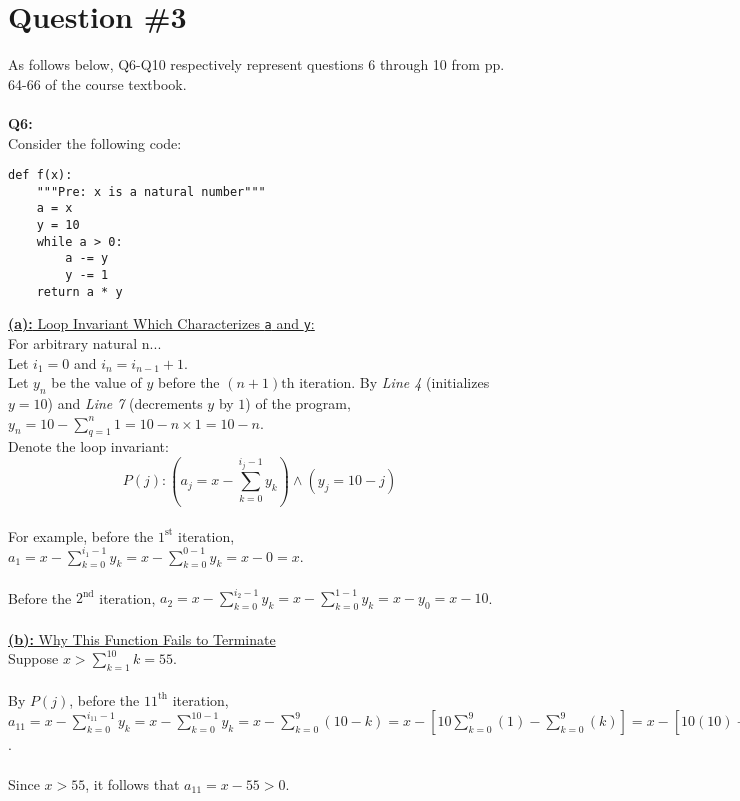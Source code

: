 \documentclass[12pt]{article}
\begin{document}
\section*{Question \#3}
As follows below, Q6-Q10 respectively represent questions 6 through 10 from pp. 64-66 of the course textbook. \\
\\
\textbf{Q6:} \\
Consider the following code:
\begin{lstlisting}
def f(x):
    """Pre: x is a natural number"""
    a = x
    y = 10
    while a > 0:
        a -= y
        y -= 1
    return a * y
\end{lstlisting}
\underline{\textbf{(a):} Loop Invariant Which Characterizes \texttt{a} and \texttt{y}:} \\
For arbitrary natural n... \\
Let $i_1 = 0$ and $i_n = i_{n-1} + 1$. \\
Let $y_n$ be the value of $y$ before the $(n + 1){\text{th}}$ iteration. By \textit{Line 4} (initializes $y = 10$) and \textit{Line 7} (decrements $y$ by $1$) of the program, $y_n = 10 - \sum_{q = 1}^{n} 1 = 10 - n \times 1 = 10 - n$. \\
Denote the loop invariant: \\
\[
P(j): (a_j = x - \sum_{k = 0}^{i_j - 1} y_k) \land (y_j = 10 - j)
\]
\\
For example, before the $1^{\text{st}}$ iteration, $a_1 = x - \sum_{k = 0}^{i_1 - 1} y_k = x - \sum_{k = 0}^{0 - 1} y_k = x - 0 = x$. \\
\\
Before the $2^{\text{nd}}$ iteration, $a_2 = x - \sum_{k = 0}^{i_2 - 1} y_k = x - \sum_{k = 0}^{1 - 1} y_k = x - y_0 = x - 10$. \\
\\
\underline{\textbf{(b):} Why This Function Fails to Terminate} \\
Suppose $x > \sum_{k=1}^{10} k = 55$. \\
\\
By $P(j)$, before the $11^{\text{th}}$ iteration, $a_{11} = x - \sum_{k = 0}^{i_{11} - 1} y_k = x - \sum_{k = 0}^{10 - 1} y_k = x - \sum_{k = 0}^{9} (10 - k) = x - [10\sum_{k = 0}^{9} (1) - \sum_{k = 0}^{9} (k)] = x - [10(10) - \frac{9(9 + 1)}{2}] = x - [100 - 45] = x - 55$. \\
\\
Since $x > 55$, it follows that $a_{11} = x - 55 > 0$. \\
\\
\end{document}
